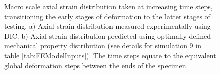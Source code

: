 \begin{figure}[!]
	 \centering
	 \centering
	\caption[Macro strain distributions]{Macro scale axial strain distribution taken at increasing time steps, transitioning the early stages of deformation to the latter stages of testing. a) Axial strain distribution measured experimentally using DIC. b) Axial strain distribution predicted using optimally defined mechanical property distribution (see details for simulation 9 in table \ref{tab:FEModelInputs}). The time steps equate to the equivalent global deformation steps between the ends of the specimen.}
	\label{fig:MacroStrains}
\end{figure}

